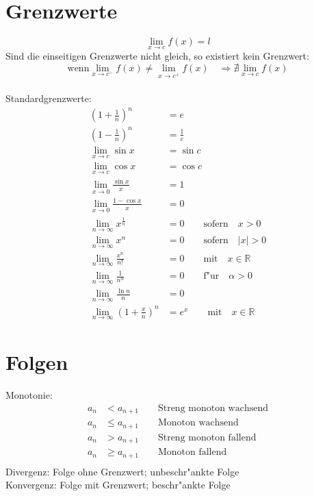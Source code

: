 \section{Grenzwerte}
\begin{equation}
\lim_{x\rightarrow c}f(x) = l
\end{equation}
Sind die einseitigen Grenzwerte nicht gleich, so existiert kein Grenzwert:
\begin{equation}
\text{wenn} \lim_{x\rightarrow c^-}f(x) \neq \lim_{x\rightarrow c^+}f(x) \quad
\Rightarrow \nexists \lim_{x\rightarrow c}f(x)
\end{equation}
\\
Standardgrenzwerte:
\begin{align}
  {\left(1+\frac{1}{n}\right)}^n &= e \\
  {\left(1-\frac{1}{n}\right)}^n &= \frac{1}{e} \\
  \lim_{x\rightarrow c}\sin{x} &= \sin{c} \\
  \lim_{x\rightarrow c}\cos{x} &= \cos{c} \\
  \lim_{x\rightarrow 0}\frac{\sin{x}}{x} &= 1 \\
  \lim_{x\rightarrow 0}\frac{1-\cos{x}}{x} &= 0 \\
  \lim_{n\rightarrow \infty}x^{\frac{1}{n}} &= 0 \qquad \text{sofern} \quad x > 0 \\
  \lim_{n\rightarrow \infty}x^n &= 0 \qquad \text{sofern} \quad |x| > 0 \\
  \lim_{n\rightarrow \infty}\frac{x^n}{n!} &= 0 \qquad \text{mit} \quad x \in \mathbb{R} \\
  \lim_{n\rightarrow \infty}\frac{1}{n^\alpha} &= 0 \qquad \text{f"ur} \quad \alpha > 0 \\
  \lim_{n\rightarrow \infty}\frac{\ln{n}}{n} &= 0 \\
  \lim_{n\rightarrow \infty}{\left(1+\frac{x}{n}\right)}^n &= e^x \qquad \text{mit} \quad x \in \mathbb{R}
\end{align}


\section{Folgen}
Monotonie:
\begin{align}
  a_n &< a_{n+1} \qquad \text{Streng monoton wachsend} \\
  a_n &\leq a_{n+1} \qquad \text{Monoton wachsend} \\
  a_n &> a_{n+1} \qquad \text{Streng monoton fallend} \\
  a_n &\geq a_{n+1} \qquad \text{Monoton fallend} \\
\end{align}
Divergenz: Folge ohne Grenzwert; unbeschr"ankte Folge \\
Konvergenz: Folge mit Grenzwert; beschr"ankte Folge \\

